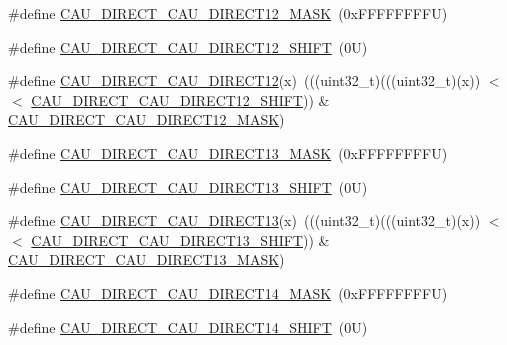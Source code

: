 \begin{DoxyCompactItemize}
\item 
\#define \mbox{\hyperlink{group___c_a_u___register___masks_gaa2ee16a89961959b8a4a936d5f6ce49c}{C\+A\+U\+\_\+\+D\+I\+R\+E\+C\+T\+\_\+\+C\+A\+U\+\_\+\+D\+I\+R\+E\+C\+T12\+\_\+\+M\+A\+SK}}~(0x\+F\+F\+F\+F\+F\+F\+F\+F\+U)
\item 
\#define \mbox{\hyperlink{group___c_a_u___register___masks_gaebc337b0562194197195ce07c9f4c7d0}{C\+A\+U\+\_\+\+D\+I\+R\+E\+C\+T\+\_\+\+C\+A\+U\+\_\+\+D\+I\+R\+E\+C\+T12\+\_\+\+S\+H\+I\+FT}}~(0\+U)
\item 
\#define \mbox{\hyperlink{group___c_a_u___register___masks_gac4ca5dade23d4243ac71ae0d9ec57d43}{C\+A\+U\+\_\+\+D\+I\+R\+E\+C\+T\+\_\+\+C\+A\+U\+\_\+\+D\+I\+R\+E\+C\+T12}}(x)~(((uint32\+\_\+t)(((uint32\+\_\+t)(x)) $<$$<$ \mbox{\hyperlink{group___c_a_u___register___masks_gaebc337b0562194197195ce07c9f4c7d0}{C\+A\+U\+\_\+\+D\+I\+R\+E\+C\+T\+\_\+\+C\+A\+U\+\_\+\+D\+I\+R\+E\+C\+T12\+\_\+\+S\+H\+I\+FT}})) \& \mbox{\hyperlink{group___c_a_u___register___masks_gaa2ee16a89961959b8a4a936d5f6ce49c}{C\+A\+U\+\_\+\+D\+I\+R\+E\+C\+T\+\_\+\+C\+A\+U\+\_\+\+D\+I\+R\+E\+C\+T12\+\_\+\+M\+A\+SK}})
\item 
\#define \mbox{\hyperlink{group___c_a_u___register___masks_ga5735753e1d7d46e22b92d806218045b2}{C\+A\+U\+\_\+\+D\+I\+R\+E\+C\+T\+\_\+\+C\+A\+U\+\_\+\+D\+I\+R\+E\+C\+T13\+\_\+\+M\+A\+SK}}~(0x\+F\+F\+F\+F\+F\+F\+F\+F\+U)
\item 
\#define \mbox{\hyperlink{group___c_a_u___register___masks_ga941037be28db6fbd833f5202ad2f21a5}{C\+A\+U\+\_\+\+D\+I\+R\+E\+C\+T\+\_\+\+C\+A\+U\+\_\+\+D\+I\+R\+E\+C\+T13\+\_\+\+S\+H\+I\+FT}}~(0\+U)
\item 
\#define \mbox{\hyperlink{group___c_a_u___register___masks_ga4ad6c63ec619cc20c8d34c230907cb72}{C\+A\+U\+\_\+\+D\+I\+R\+E\+C\+T\+\_\+\+C\+A\+U\+\_\+\+D\+I\+R\+E\+C\+T13}}(x)~(((uint32\+\_\+t)(((uint32\+\_\+t)(x)) $<$$<$ \mbox{\hyperlink{group___c_a_u___register___masks_ga941037be28db6fbd833f5202ad2f21a5}{C\+A\+U\+\_\+\+D\+I\+R\+E\+C\+T\+\_\+\+C\+A\+U\+\_\+\+D\+I\+R\+E\+C\+T13\+\_\+\+S\+H\+I\+FT}})) \& \mbox{\hyperlink{group___c_a_u___register___masks_ga5735753e1d7d46e22b92d806218045b2}{C\+A\+U\+\_\+\+D\+I\+R\+E\+C\+T\+\_\+\+C\+A\+U\+\_\+\+D\+I\+R\+E\+C\+T13\+\_\+\+M\+A\+SK}})
\item 
\#define \mbox{\hyperlink{group___c_a_u___register___masks_ga8145212bbedada0193bfa6042ea637a6}{C\+A\+U\+\_\+\+D\+I\+R\+E\+C\+T\+\_\+\+C\+A\+U\+\_\+\+D\+I\+R\+E\+C\+T14\+\_\+\+M\+A\+SK}}~(0x\+F\+F\+F\+F\+F\+F\+F\+F\+U)
\item 
\#define \mbox{\hyperlink{group___c_a_u___register___masks_ga017a8a273655c5f491aa2b348b1ed9bc}{C\+A\+U\+\_\+\+D\+I\+R\+E\+C\+T\+\_\+\+C\+A\+U\+\_\+\+D\+I\+R\+E\+C\+T14\+\_\+\+S\+H\+I\+FT}}~(0\+U)

\end{DoxyCompactItemize}
